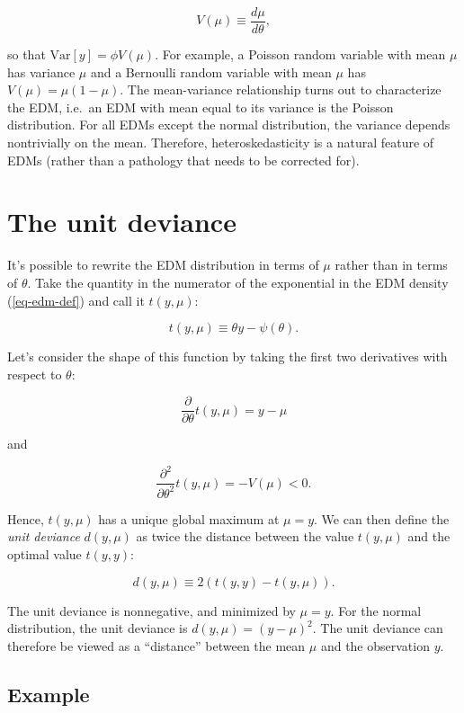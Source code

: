 \documentclass[
  11pt,
  letterpaper,
  oneside]{book}
\theoremstyle{definition}
\theoremstyle{plain}
\theoremstyle{plain}
\theoremstyle{plain}
\theoremstyle{remark}
\begin{document}
\[
V(\mu) \equiv \frac{d\mu}{d\theta},
\]

so that \(\text{Var}[y] = \phi V(\mu)\). For example, a Poisson random
variable with mean \(\mu\) has variance \(\mu\) and a Bernoulli random
variable with mean \(\mu\) has \(V(\mu) = \mu(1-\mu)\). The
mean-variance relationship turns out to characterize the EDM, i.e.~an
EDM with mean equal to its variance is the Poisson distribution. For all
EDMs except the normal distribution, the variance depends nontrivially
on the mean. Therefore, heteroskedasticity is a natural feature of EDMs
(rather than a pathology that needs to be corrected for).

\hypertarget{the-unit-deviance}{%
\section{The unit deviance}\label{the-unit-deviance}}

It's possible to rewrite the EDM distribution in terms of \(\mu\) rather
than in terms of \(\theta\). Take the quantity in the numerator of the
exponential in the EDM density (\ref{eq-edm-def}) and call it
\(t(y, \mu)\):

\[
t(y, \mu) \equiv \theta y - \psi(\theta).
\]

Let's consider the shape of this function by taking the first two
derivatives with respect to \(\theta\):

\[
\frac{\partial}{\partial \theta}t(y, \mu) = y - \mu
\]

and

\[
\frac{\partial^2}{\partial \theta^2}t(y, \mu) = -V(\mu) < 0.
\]

Hence, \(t(y, \mu)\) has a unique global maximum at \(\mu = y\). We can
then define the \emph{unit deviance} \(d(y, \mu)\) as twice the distance
between the value \(t(y, \mu)\) and the optimal value \(t(y,y)\):

\[
d(y, \mu) \equiv 2(t(y, y) - t(y, \mu)).
\]

The unit deviance is nonnegative, and minimized by \(\mu = y\). For the
normal distribution, the unit deviance is \(d(y, \mu) = (y - \mu)^2\).
The unit deviance can therefore be viewed as a ``distance'' between the
mean \(\mu\) and the observation \(y\).

\hypertarget{example-1}{%
\subsection{Example}\label{example-1}}
\end{document}

